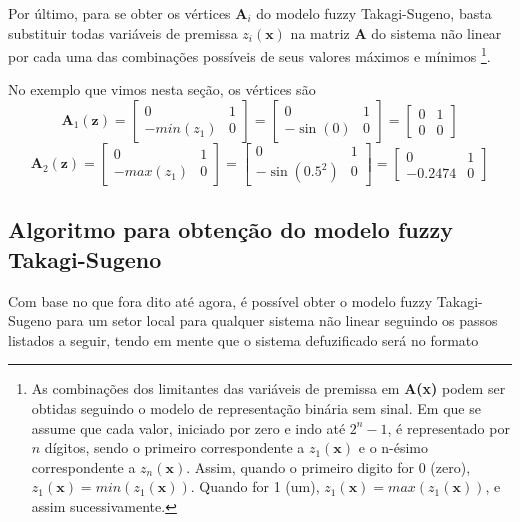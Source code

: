 Por último, para se obter os vértices $\textbf{A}_i$ do modelo fuzzy Takagi-Sugeno, basta substituir todas variáveis de premissa $z_i(\textbf{x})$ na matriz $\textbf{A}$ do sistema não linear por cada uma das combinações  possíveis de seus valores máximos e mínimos \footnote{As combinações dos limitantes das variáveis de premissa em \textbf{A(x)} podem ser obtidas seguindo o modelo de representação binária sem sinal. Em que se assume que cada valor, iniciado por zero e indo até $2^n-1$, é representado por $n$ dígitos, sendo o primeiro correspondente a $z_1(\textbf{x})$ e o n-ésimo correspondente a $z_n(\textbf{x})$. Assim, quando o primeiro digito for 0 (zero),  $z_1(\textbf{x}) = min(z_1(\textbf{x}))$. Quando for 1 (um), $z_1(\textbf{x}) = max(z_1(\textbf{x}))$, e assim sucessivamente.}.

No exemplo que vimos nesta seção, os vértices são
\begin{equation*}
\textbf{A}_1 (\textbf{z}) =
 \begin{bmatrix}0&1 \\-min(z_1)&0\end{bmatrix} = 
\begin{bmatrix}0&1 \\-\sin(0)&0\end{bmatrix} = 
\begin{bmatrix}0&1 \\0&0\end{bmatrix}
\end{equation*}
\begin{equation*}
\textbf{A}_2(\textbf{z})= \begin{bmatrix}0&1 \\-max(z_1)&0\end{bmatrix} = \begin{bmatrix}0&1 \\-\sin(0.5^2)&0\end{bmatrix} = \begin{bmatrix}0&1 \\-0.2474&0\end{bmatrix}
\end{equation*}

\subsection{Algoritmo para obtenção do modelo fuzzy Takagi-Sugeno}

Com base no que fora dito até agora, é possível obter o modelo fuzzy Takagi-Sugeno para um setor local para qualquer sistema não linear seguindo os passos listados a seguir, tendo em mente que o sistema defuzificado será no formato

